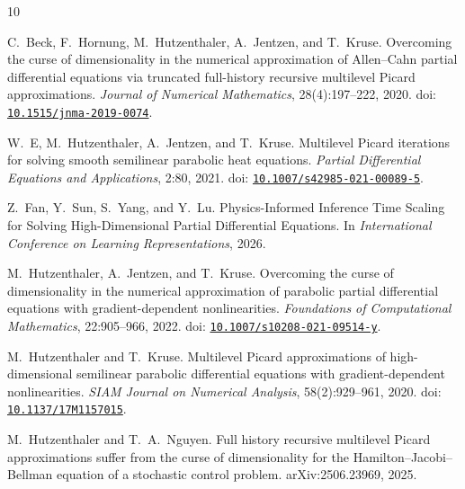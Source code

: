 \documentclass{article}
\begin{document}
\begin{thebibliography}{10}

C.~Beck, F.~Hornung, M.~Hutzenthaler, A.~Jentzen, and T.~Kruse.
\newblock Overcoming the curse of dimensionality in the numerical approximation of Allen--Cahn partial differential equations via truncated full-history recursive multilevel Picard approximations.
\newblock \emph{Journal of Numerical Mathematics}, 28(4):197--222, 2020.
\newblock doi: \href{https://doi.org/10.1515/jnma-2019-0074}{\nolinkurl{10.1515/jnma-2019-0074}}.

W.~E, M.~Hutzenthaler, A.~Jentzen, and T.~Kruse.
\newblock Multilevel Picard iterations for solving smooth semilinear parabolic heat equations.
\newblock \emph{Partial Differential Equations and Applications}, 2:80, 2021.
\newblock doi: \href{https://doi.org/10.1007/s42985-021-00089-5}{\nolinkurl{10.1007/s42985-021-00089-5}}.

Z.~Fan, Y.~Sun, S.~Yang, and Y.~Lu.
\newblock Physics-Informed Inference Time Scaling for Solving High-Dimensional Partial Differential Equations.
\newblock In \emph{International Conference on Learning Representations}, 2026.

M.~Hutzenthaler, A.~Jentzen, and T.~Kruse.
\newblock Overcoming the curse of dimensionality in the numerical approximation of parabolic partial differential equations with gradient-dependent nonlinearities.
\newblock \emph{Foundations of Computational Mathematics}, 22:905--966, 2022.
\newblock doi: \href{https://doi.org/10.1007/s10208-021-09514-y}{\nolinkurl{10.1007/s10208-021-09514-y}}.

M.~Hutzenthaler and T.~Kruse.
\newblock Multilevel Picard approximations of high-dimensional semilinear parabolic differential equations with gradient-dependent nonlinearities.
\newblock \emph{SIAM Journal on Numerical Analysis}, 58(2):929--961, 2020.
\newblock doi: \href{https://doi.org/10.1137/17M1157015}{\nolinkurl{10.1137/17M1157015}}.

M.~Hutzenthaler and T.~A.~Nguyen.
\newblock Full history recursive multilevel Picard approximations suffer from the curse of dimensionality for the Hamilton--Jacobi--Bellman equation of a stochastic control problem.
\newblock arXiv:2506.23969, 2025.



\end{thebibliography}
\end{document}

